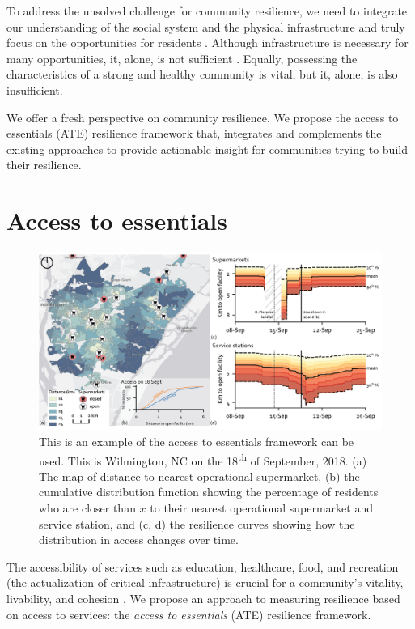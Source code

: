 \documentclass[9pt,twocolumn,twoside,lineno]{pnas-new}
\begin{document}
To address the unsolved challenge for community resilience, we need to integrate our understanding of the social system and the physical infrastructure and truly focus on the opportunities for residents \cite{Koliou2018-jt, Cutter2016-landscape}.
Although infrastructure is necessary for many opportunities, it, alone, is not sufficient \cite{Doorn2018-fx}.
Equally, possessing the characteristics of a strong and healthy community is vital, but it, alone, is also insufficient.

We offer a fresh perspective on community resilience.
We propose the access to essentials (ATE) resilience framework that, integrates and complements the existing approaches to provide actionable insight for communities trying to build their resilience.

\section*{Access to essentials}

\begin{figure}
    \centering
    \includegraphics[width=\linewidth]{report/fig/NC_resilience.png}
    \caption{This is an example of the access to essentials framework can be used. This is Wilmington, NC on the 18\textsuperscript{th} of September, 2018. (a) The map of distance to nearest operational supermarket, (b) the cumulative distribution function showing the percentage of residents who are closer than $x$ to their nearest operational supermarket and service station, and (c, d) the resilience curves showing how the distribution in access changes over time.
    }
    \label{fig:fig1}
\end{figure}

The accessibility of services such as education, healthcare, food, and recreation (the actualization of critical infrastructure) is crucial for a community’s vitality, livability, and cohesion \cite{Dempsey2011-og, Talen2003-dc, Winter1997-kc}. 
We propose an approach to measuring resilience based on access to services: the \textit{access to essentials} (ATE) resilience framework.
\end{document}
